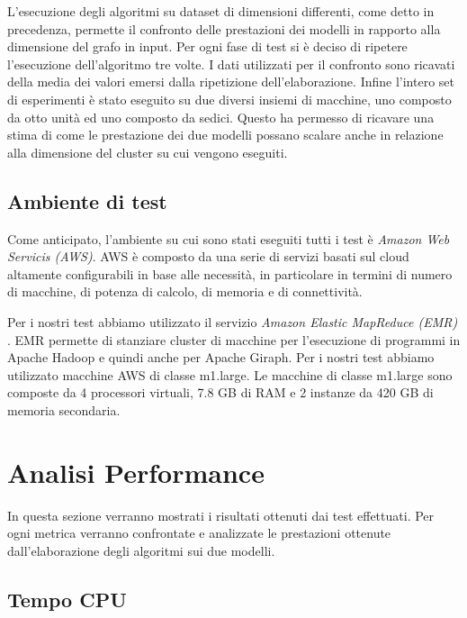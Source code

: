 \documentclass[LaM,binding=0.6cm]{sapthesis}
\begin{document}
L'esecuzione degli algoritmi su dataset di dimensioni differenti, come detto in precedenza, permette il confronto delle prestazioni dei modelli in rapporto alla dimensione del grafo in input.
Per ogni fase di test si è deciso di ripetere l'esecuzione dell'algoritmo tre volte. I dati utilizzati per il  confronto sono ricavati della media dei valori emersi dalla ripetizione dell'elaborazione.
Infine l'intero set di esperimenti è stato eseguito su due diversi insiemi di macchine, uno composto da otto unità ed uno composto da sedici. Questo ha permesso di ricavare una stima di come le prestazione dei due modelli possano scalare anche in relazione alla dimensione del cluster su cui vengono eseguiti.

\subsection{Ambiente di test}

Come anticipato, l'ambiente su cui sono stati eseguiti tutti i test è \textit{Amazon Web Servicis (AWS)}. 
AWS è composto da una serie di servizi basati sul cloud altamente configurabili in base alle necessità, in particolare in termini di numero di macchine, di potenza di calcolo, di memoria e di connettività.

Per i nostri test abbiamo utilizzato il servizio \textit{Amazon Elastic MapReduce (EMR)} \cite{1_amazon web services}. EMR 	permette di stanziare cluster  di macchine per l'esecuzione di programmi in Apache Hadoop e quindi anche per Apache Giraph. Per i nostri test abbiamo utilizzato macchine AWS di classe m1.large. Le macchine di classe m1.large sono composte da 4 processori virtuali, 7.8 GB di RAM e 2 instanze da 420 GB di memoria secondaria.




\section{Analisi Performance}


In questa sezione verranno mostrati i risultati ottenuti dai test effettuati. Per ogni metrica verranno confrontate e analizzate le prestazioni ottenute dall'elaborazione degli algoritmi sui due modelli.



\subsection{Tempo CPU}
\end{document}
